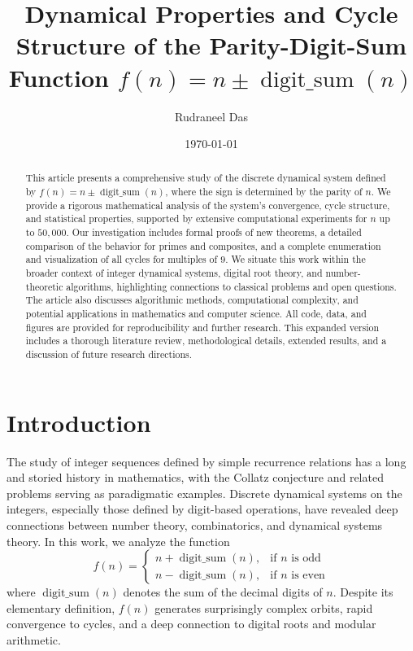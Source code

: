 \documentclass[12pt]{article}
\title{Dynamical Properties and Cycle Structure of the Parity-Digit-Sum Function $f(n) = n \pm \operatorname{digit\_sum}(n)$}
\author{Rudraneel Das}
\date{\today}
\begin{document}
\maketitle


\begin{abstract}
This article presents a comprehensive study of the discrete dynamical system defined by $f(n) = n \pm \operatorname{digit\_sum}(n)$, where the sign is determined by the parity of $n$. We provide a rigorous mathematical analysis of the system's convergence, cycle structure, and statistical properties, supported by extensive computational experiments for $n$ up to $50,000$. Our investigation includes formal proofs of new theorems, a detailed comparison of the behavior for primes and composites, and a complete enumeration and visualization of all cycles for multiples of $9$. We situate this work within the broader context of integer dynamical systems, digital root theory, and number-theoretic algorithms, highlighting connections to classical problems and open questions. The article also discusses algorithmic methods, computational complexity, and potential applications in mathematics and computer science. All code, data, and figures are provided for reproducibility and further research. This expanded version includes a thorough literature review, methodological details, extended results, and a discussion of future research directions.
\end{abstract}

\tableofcontents


\section{Introduction}
The study of integer sequences defined by simple recurrence relations has a long and storied history in mathematics, with the Collatz conjecture and related problems serving as paradigmatic examples. Discrete dynamical systems on the integers, especially those defined by digit-based operations, have revealed deep connections between number theory, combinatorics, and dynamical systems theory. In this work, we analyze the function
\begin{equation}
    f(n) = \begin{cases}
        n + \operatorname{digit\_sum}(n), & \text{if } n \text{ is odd} \\
        n - \operatorname{digit\_sum}(n), & \text{if } n \text{ is even}
    \end{cases}
\end{equation}
where $\operatorname{digit\_sum}(n)$ denotes the sum of the decimal digits of $n$. Despite its elementary definition, $f(n)$ generates surprisingly complex orbits, rapid convergence to cycles, and a deep connection to digital roots and modular arithmetic. 
\end{document}
